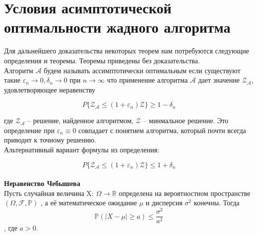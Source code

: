 \documentclass[a4paper, 14pt]{extarticle}
\numberwithin{equation}{section}
\begin{document}
\newcommand{\algorithm}{$\mathcal{A}$}
\newcommand{\topboundE}{$\mathcal{Z^*_{A}}$}
\newcommand{\topboundD}{$\mathcal{D^*_{A}}$}
\newcommand{\randomvalue}{$\mathcal{Z_{A}}$}
\newcommand{\randomvalueE}{$E(\text{\randomvalue})$}
\newcommand{\randomvalueD}{$D(\text{\randomvalue})$}

\section{Условия асимптотической оптимальности жадного алгоритма}

Для дальнейшего доказательства некоторых теорем нам потребуются следующие определения и теоремы. Теоремы приведены без доказательства.\\


Алгоритм $\mathcal{A}$ будем называть ассимптотически оптимальным если существуют такие $\varepsilon_n \rightarrow 0, \delta_n \rightarrow 0$ при $n \rightarrow \infty$ что применение алгоритма $\mathcal{A}$ дает значение  $\mathcal{Z_A}$, удовлетворяющее неравенству
 
\begin{equation}\label{1}
P\{\mathcal{Z_A} \leqslant (1+\varepsilon_n)\mathcal{Z}\}\geqslant 1-\delta_n
\end{equation}

\noindent где $\mathcal{Z_A}$ -- решение, найденное алгоритмом, $\mathcal{Z}$ -- минмальное решение.
Это определение при $\varepsilon_n \equiv 0$ совпадает с понятием алгоритма, который почти всегда приводит к точному решению. \\

Альтернативный вариант формулы из определения:

\begin{equation*}
P\{\mathcal{Z_A} \leqslant (1+\varepsilon_n)\mathcal{Z}\}\leqslant 1+\delta_n
\end{equation*} \\


\textbf{Неравенство Чебышева} \\

Пусть случайная величина X: $\Omega\rightarrow\mathbb {R}$ определена на вероятностном пространстве $(\Omega,{\mathcal {F}},\mathbb {P})$
, а её математическое ожидание $\mu$ и дисперсия  $\sigma ^{2}$ конечны. Тогда 
\begin{equation*}
{\mathbb {P}}\left(|X-\mu |\geqslant a\right)\leqslant {\frac {\sigma ^{2}}{a^{2}}}
\end{equation*},
где  $a>0$. \\ \\
\end{document}
